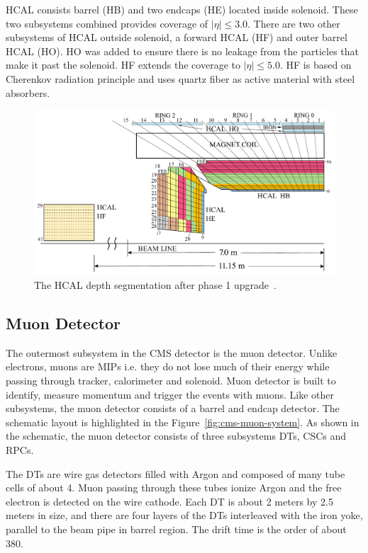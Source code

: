 \gls{HCAL} consists barrel (HB) and two endcaps (HE) located inside solenoid.
These two subsystems combined provides
coverage of \( |\eta| \le 3.0 \).
There are two other subsystems of \gls{HCAL} outside solenoid,
a forward \gls{HCAL} (HF) and outer barrel \gls{HCAL} (HO).
HO was added to ensure there is no leakage from the particles that
make it past the solenoid. HF extends the coverage
to \(|\eta| \le 5.0\). HF is based on Cherenkov radiation principle
and uses quartz fiber as active material with steel absorbers.

\begin{figure}[!ht]
  \centering
  \includegraphics[width=\textwidth]{figures/cms_hcal_depth_seg.pdf}
  \caption[The \gls{HCAL} depth segmentation after phase 1 upgrade]%
  {The \gls{HCAL} depth segmentation after phase 1 upgrade~\cite{image-cms-hcal-depth}.}%
  \label{fig:cms-hcal-depth}
\end{figure}

\subsection{
  Muon Detector
}

The outermost subsystem in the \gls{CMS} detector is the muon detector.
Unlike electrons, muons are \glspl{MIP} i.e.
they do not lose much of their energy
while passing through tracker, calorimeter and solenoid.
Muon detector is built to identify, measure momentum and trigger the events
with muons. Like other subsystems, the muon detector consists of a barrel and endcap
detector. The schematic layout is highlighted in the Figure~\ref{fig:cms-muon-system}.
As shown in the schematic, the muon detector consists of three subsystems \glspl{DT}, \glspl{CSC} and
\glspl{RPC}.

The \glspl{DT} are wire gas detectors filled with Argon and composed of
many tube cells of about 4\cm{}. Muon passing through these tubes
ionize Argon and the free electron is detected on the wire cathode.
Each DT is about 2 meters by 2.5 meters in size, and there are four layers
of the \glspl{DT} interleaved with the iron yoke, parallel to
the beam pipe in barrel region. The drift time is the order of about 380\nanoseconds.

